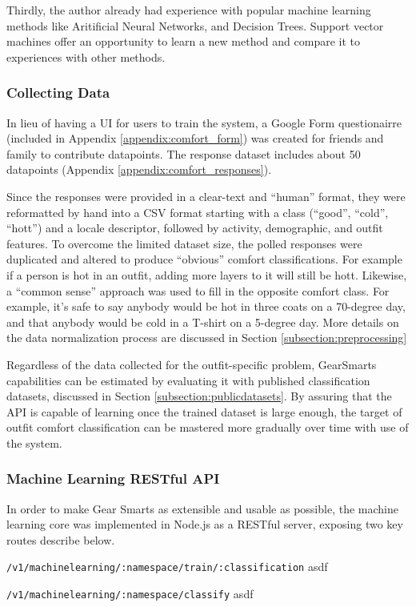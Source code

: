 Thirdly, the author already had experience with popular machine learning methods like Aritificial Neural Networks, and
Decision Trees. Support vector machines offer an opportunity to learn a new method and compare it to experiences with
other methods.

\subsubsection{Collecting Data}
In lieu of having a UI for users to train the system, a Google Form questionairre (included in Appendix
\ref{appendix:comfort_form}) was created for
friends and family to contribute datapoints. The response dataset includes about 50 datapoints (Appendix \ref{appendix:comfort_responses}).

Since the responses were provided in a clear-text and ``human'' format, they were reformatted by hand into a CSV format
starting with a class (``good'', ``cold'', ``hott'') and a locale descriptor, followed by activity, demographic, and
outfit features. To overcome the limited dataset size, the polled responses were duplicated and altered to produce ``obvious''
comfort classifications. For example if a person is hot in an outfit, adding more layers to it will still be hott.
Likewise, a ``common sense'' approach was used to fill in the opposite comfort class. For example, it's safe to say anybody
would be hot in three coats on a 70-degree day, and that anybody would be cold in a T-shirt on a 5-degree day.
More details on the data normalization process are discussed in Section \ref{subsection:preprocessing}

Regardless of the data collected for the outfit-specific problem, GearSmarts capabilities can be estimated by evaluating
it with published classification datasets, discussed in Section \ref{subsection:publicdatasets}. By assuring that the API
is capable of learning once the trained dataset is large enough, the target of outfit comfort classification
can be mastered more gradually over time with use of the system.

\subsubsection{Machine Learning RESTful API}
\label{section:mlapi}
In order to make Gear Smarts as extensible and usable as possible, the machine learning core was implemented in Node.js
as a RESTful server, exposing two key routes describe below.

\begin{description}
    \item{\texttt{/v1/machinelearning/:namespace/train/:classification}} asdf
    \item{\texttt{/v1/machinelearning/:namespace/classify}} asdf
\end{description}

